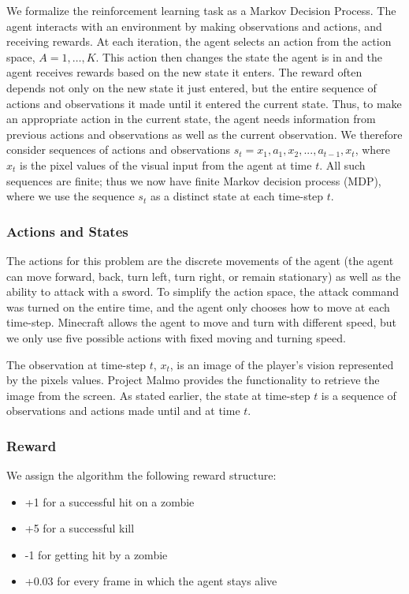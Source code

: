 \documentclass{article}
\begin{document}
\begin{multicols}{2}
We formalize the reinforcement learning task as a Markov Decision Process.
The agent interacts with an environment by making observations and actions, and receiving rewards.
At each iteration, the agent selects an action from the action space, $A = {1, \dots , K }$.
This action then changes the state the agent is in and the agent receives rewards based on the new state it enters.
The reward often depends not only on the new state it just entered, but the entire sequence of actions and observations it made until it entered the current state.
Thus, to make an appropriate action in the current state, the agent needs information from previous actions and observations as well as the current observation.
We therefore consider sequences of actions and observations $s_t = x_1, a_1, x_2, ..., a_{t-1}, x_t$, where $x_t$ is the pixel values of the visual input from the agent at time $t$.
All such sequences are finite; thus we now have finite Markov decision process (MDP), where we use the sequence $s_t$ as a distinct state at each time-step $t$.

\subsubsection{Actions and States}

The actions for this problem are the discrete movements of the agent (the agent can move forward, back, turn left, turn right, or remain stationary) as well as the ability to attack with a sword. To simplify the action space, the attack command was turned on the entire time, and the agent only chooses how to move at each time-step. Minecraft allows the agent to move and turn with different speed, but we only use five possible actions with fixed moving and turning speed.

The observation at time-step $t$, $x_t$, is an image of the player's vision represented by the pixels values.
Project Malmo provides the functionality to retrieve the image from the screen.
As stated earlier, the state at time-step $t$ is a sequence of observations and actions made until and at time $t$.


\subsubsection{Reward}

We assign the algorithm the following reward structure:
\begin{itemize}
    \item +1 for a successful hit on a zombie
    \item +5 for a successful kill
    \item -1 for getting hit by a zombie
    \item +0.03 for every frame in which the agent stays alive
\end{itemize}


\end{multicols}
\end{document}
